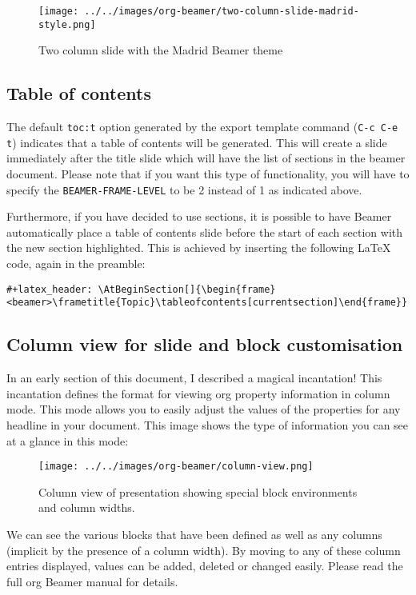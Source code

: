 \documentclass[presentation]{beamer}
\begin{document}
\begin{figure}[htbp]
\centering
\texttt{[image: ../../images/org-beamer/two-column-slide-madrid-style.png]}
\caption{Two column slide with the Madrid Beamer theme}
\end{figure}

\subsection{Table of contents}
\label{sec:org7f1748b}

The default \texttt{toc:t} option generated by the export template command
(\texttt{C-c C-e t}) indicates that a table of contents will be generated.
This will create a slide immediately after the title slide which will
have the list of sections in the beamer document.  Please note that if
you want this type of functionality, you will have to specify the
\texttt{BEAMER-FRAME-LEVEL} to be 2 instead of 1 as indicated above.

Furthermore, if you have decided to use sections, it is possible to
have Beamer automatically place a table of contents slide before the
start of each section with the new section highlighted.  This is
achieved by inserting the following \LaTeX{} code, again in the
preamble:
\begin{verbatim}
#+latex_header: \AtBeginSection[]{\begin{frame}<beamer>\frametitle{Topic}\tableofcontents[currentsection]\end{frame}}
\end{verbatim}

\subsection{Column view for slide and block customisation}
\label{sec:org3feb8e4}

In an early section of this document, I described a magical
incantation!  This incantation defines the format for viewing org
property information in column mode.  This mode allows you to easily
adjust the values of the properties for any headline in your
document.  This image shows the type of information you can see at a
glance in this mode:

\begin{figure}[htbp]
\centering
\texttt{[image: ../../images/org-beamer/column-view.png]}
\caption{Column view of presentation showing special block environments and column widths.}
\end{figure}

We can see the various blocks that have been defined as well as any
columns (implicit by the presence of a column width).  By moving to
any of these column entries displayed, values can be added, deleted or
changed easily.  Please read the full org Beamer manual for details.
\end{document}
